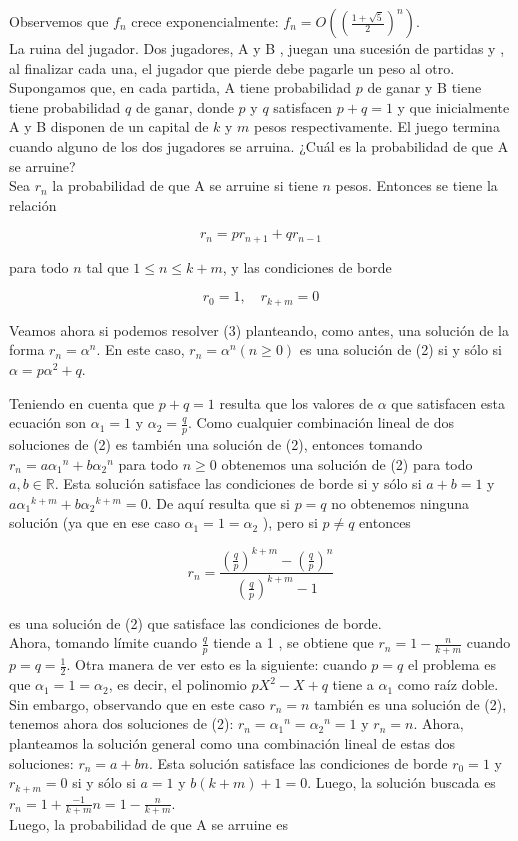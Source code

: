 \documentclass[10pt]{article}
\begin{document}
Observemos que $f_{n}$ crece exponencialmente: $f_{n}=O\left(\left(\frac{1+\sqrt{5}}{2}\right)^{n}\right)$.\\
La ruina del jugador. Dos jugadores, A y B , juegan una sucesión de partidas y , al finalizar cada una, el jugador que pierde debe pagarle un peso al otro. Supongamos que, en cada partida, A tiene probabilidad $p$ de ganar y B tiene tiene probabilidad $q$ de ganar, donde $p$ y $q$ satisfacen $p+q=1$ y que inicialmente A y B disponen de un capital de $k$ y $m$ pesos respectivamente. El juego termina cuando alguno de los dos jugadores se arruina. ¿Cuál es la probabilidad de que A se arruine?\\
Sea $r_{n}$ la probabilidad de que A se arruine si tiene $n$ pesos. Entonces se tiene la relación


\begin{equation*}
r_{n}=p r_{n+1}+q r_{n-1} \tag{2}
\end{equation*}


para todo $n$ tal que $1 \leq n \leq k+m$, y las condiciones de borde

$$
r_{0}=1, \quad r_{k+m}=0
$$

Veamos ahora si podemos resolver (3) planteando, como antes, una solución de la forma $r_{n}=\alpha^{n}$. En este caso, $r_{n}=\alpha^{n}(n \geq 0)$ es una solución de (2) si y sólo si $\alpha=p \alpha^{2}+q$.

Teniendo en cuenta que $p+q=1$ resulta que los valores de $\alpha$ que satisfacen esta ecuación son $\alpha_{1}=1$ y $\alpha_{2}=\frac{q}{p}$. Como cualquier combinación lineal de dos soluciones de (2) es también una solución de (2), entonces tomando $r_{n}=a \alpha_{1}{ }^{n}+b \alpha_{2}{ }^{n}$ para todo $n \geq 0$ obtenemos una solución de (2) para todo $a, b \in \mathbb{R}$. Esta solución satisface las condiciones de borde si y sólo si $a+b=1$ y $a \alpha_{1}{ }^{k+m}+b \alpha_{2}{ }^{k+m}=0$. De aquí resulta que si $p=q$ no obtenemos ninguna solución (ya que en ese caso $\alpha_{1}=1=\alpha_{2}$ ), pero si $p \neq q$ entonces

$$
r_{n}=\frac{\left(\frac{q}{p}\right)^{k+m}-\left(\frac{q}{p}\right)^{n}}{\left(\frac{q}{p}\right)^{k+m}-1}
$$

es una solución de (2) que satisface las condiciones de borde.\\
Ahora, tomando límite cuando $\frac{q}{p}$ tiende a 1 , se obtiene que $r_{n}=1-\frac{n}{k+m}$ cuando $p=q=\frac{1}{2}$. Otra manera de ver esto es la siguiente: cuando $p=q$ el problema es que $\alpha_{1}=1=\alpha_{2}$, es decir, el polinomio $p X^{2}-X+q$ tiene a $\alpha_{1}$ como raíz doble. Sin embargo, observando que en este caso $r_{n}=n$ también es una solución de (2), tenemos ahora dos soluciones de (2): $r_{n}=\alpha_{1}{ }^{n}=\alpha_{2}{ }^{n}=1$ y $r_{n}=n$. Ahora, planteamos la solución general como una combinación lineal de estas dos soluciones: $r_{n}=a+b n$. Esta solución satisface las condiciones de borde $r_{0}=1$ y $r_{k+m}=0$ si y sólo si $a=1$ y $b(k+m)+1=0$. Luego, la solución buscada es $r_{n}=1+\frac{-1}{k+m} n=1-\frac{n}{k+m}$.\\
Luego, la probabilidad de que A se arruine es
\end{document}
